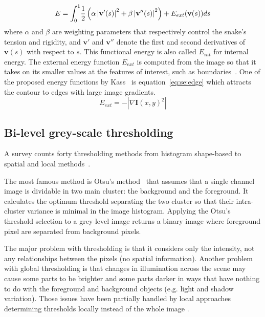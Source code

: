 \begin{equation}\label{eq:se:energy1}
  E = \int_0^1 \! \frac{1}{2} \left( \alpha \left|\mathbf{v}'(s) \right|^2 + \beta \left| \mathbf{v}''(s) \right|^2 \right) + E_{ext}(\mathbf{v}(s))ds\\
\end{equation}
where $\alpha$ and $\beta$ are weighting parameters that respectively control the snake's tension and rigidity, and $\mathbf{v}'$ and $\mathbf{v}''$ denote the first and second derivatives of $\mathbf{v}(s)$ with respect to $s$. This functional energy is also called $E_{int}$ for internal energy.
The external energy function $E_{ext}$ is computed from the image so that it takes on its smaller values at the features of interest, such as boundaries~\cite{Xu1998}.
One of the proposed energy functions by Kass~\cite{Kass1988} is equation~\ref{eq:se:edge} which attracts the contour to edges with large image gradients. 
\begin{equation}\label{eq:se:edge}
  E_{ext} = -|\nabla \mathbf{I}(x,y)^2|
\end{equation}


\subsection*{Bi-level grey-scale thresholding} %
\label{sub:ap:bi_threshold}
A survey counts forty thresholding methods from histogram shape-based to spatial and local methods~\cite{sezgin2004survey}.
 
The most famous method is Otsu's method~\cite{otsu79} that assumes that a single channel image is dividable in two main cluster: the background and the foreground.
It calculates the optimum threshold separating the two cluster so that their intra-cluster variance is minimal in the image histogram.
Applying the Otsu's threshold selection to a grey-level image returns a binary image where foreground pixel are separated from background pixels.

The major problem with thresholding is that it considers only the intensity, not any relationships between the pixels (no spatial information).
Another problem with global thresholding is that changes in illumination across the scene may cause some parts to be brighter and some parts darker in ways that have nothing to do with the foreground and background objects (e.g. light and shadow variation).
Those issues have been partially handled by local approaches determining thresholds locally instead of the whole image \modif{[REF???]}.


